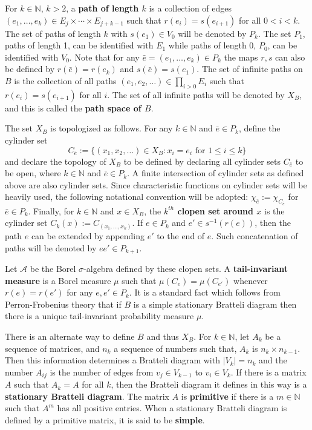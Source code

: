 \documentclass[12pt]{amsart}
\theoremstyle{plain}
\theoremstyle{definition}
\begin{document}
For $k\in\mathbb{N}$, $k>2$, a \textbf{path of length $k$} is a collection of edges $(e_1,\dots ,e_k)\in E_{j}\times \cdots \times E_{j+k-1}$ such that $r(e_i) = s(e_{i+1})$ for all $0<i<k$. The set of paths of length $k$ with $s(e_1)\in V_0$ will be denoted by $P_k$. The set $P_1$, paths of length 1, can be identified with $E_1$ while paths of length 0, $P_0$, can be identified with $V_0$. Note that for any $\bar{e} = (e_1,\dots, e_k)\in P_k $ the maps $r,s$ can also be defined by $r(\bar{e}) = r(e_k)$ and $s(\bar{e}) = s(e_1)$. The set of infinite paths on $B$ is the collection of all paths $(e_1,e_2,\dots)\in \prod_{i>0} E_i$ such that $r(e_i) = s(e_{i+1})$ for all $i$. The set of all infinite paths will be denoted by $X_B$, and this is called the \textbf{path space of $B$}.

The set $X_B$ is topologized as follows. For any $k\in\mathbb{N}$ and $\bar{e}\in P_k$, define the cylinder set
$$C_{\bar{e}}:= \{(x_1,x_2,\dots)\in X_B: x_i = e_i\mbox{ for }1\leq i \leq k\}$$ 
and declare the topology of $X_B$ to be defined by declaring all cylinder sets $C_{\bar{e}}$ to be open, where $k\in \mathbb{N}$ and $\bar{e}\in P_k$. A finite intersection of cylinder sets as defined above are also cylinder sets. Since characteristic functions on cylinder sets will be heavily used, the following notational convention will be adopted: $\chi_{\bar{e}} := \chi_{C_{\bar{e}}}$ for $\bar{e}\in P_k$. Finally, for $k\in\mathbb{N}$ and $x\in X_B$, the \textbf{$k^{th}$ clopen set around $x$} is the cylinder set $C_k(x):= C_{(x_1,\dots, x_k)}$. If $e\in P_k$ and $e'\in s^{-1}(r(e))$, then the path $e$ can be extended by appending $e'$ to the end of $e$. Such concatenation of paths will be denoted by $e e'\in P_{k+1}$. 

Let $\mathcal{A}$ be the Borel $\sigma$-algebra defined by these clopen sets. A \textbf{tail-invariant measure} is a Borel measure $\mu$ such that $\mu(C_e) = \mu(C_{e'})$ whenever $r(e) = r(e')$ for any $e,e'\in P_k$. It is a standard fact which follows from Perron-Frobenius theory that if $B$ is a simple stationary Bratteli diagram then there is a unique tail-invariant probability measure $\mu$.

There is an alternate way to define $B$ and thus $X_B$. For $k\in \mathbb{N}$, let $A_k$ be a sequence of matrices, and $n_k$ a sequence of numbers such that, $A_k$ is $n_k\times n_{k-1}$. Then this information determines a Bratteli diagram with $|V_k| = n_k$ and the number $A_{ij}$ is the number of edges from $v_j\in V_{k-1}$ to $v_i\in V_k$. If there is a matrix $A$ such that $A_k = A$ for all $k$, then the Bratteli diagram it defines in this way is a \textbf{stationary Bratteli diagram}. The matrix $A$ is \textbf{primitive} if there is a $m\in\mathbb{N}$ such that $A^m$ has all positive entries. When a stationary Bratteli diagram is defined by a primitive matrix, it is said to be \textbf{simple}.
\end{document}
